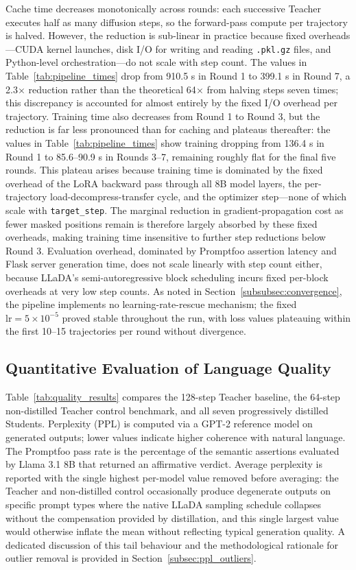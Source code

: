 \documentclass[11pt, a4paper]{article}
\begin{document}
Cache time decreases monotonically across rounds: each successive Teacher executes half as many diffusion steps, so the forward-pass compute per trajectory is halved. However, the reduction is sub-linear in practice because fixed overheads---CUDA kernel launches, disk I/O for writing and reading \texttt{.pkl.gz} files, and Python-level orchestration---do not scale with step count. The values in Table~\ref{tab:pipeline_times} drop from 910.5 s in Round 1 to 399.1 s in Round 7, a 2.3$\times$ reduction rather than the theoretical 64$\times$ from halving steps seven times; this discrepancy is accounted for almost entirely by the fixed I/O overhead per trajectory. Training time also decreases from Round 1 to Round 3, but the reduction is far less pronounced than for caching and plateaus thereafter: the values in Table~\ref{tab:pipeline_times} show training dropping from 136.4 s in Round 1 to 85.6--90.9 s in Rounds 3--7, remaining roughly flat for the final five rounds. This plateau arises because training time is dominated by the fixed overhead of the LoRA backward pass through all 8B model layers, the per-trajectory load-decompress-transfer cycle, and the optimizer step---none of which scale with \texttt{target\_step}. The marginal reduction in gradient-propagation cost as fewer masked positions remain is therefore largely absorbed by these fixed overheads, making training time insensitive to further step reductions below Round 3. Evaluation overhead, dominated by Promptfoo assertion latency and Flask server generation time, does not scale linearly with step count either, because LLaDA's semi-autoregressive block scheduling incurs fixed per-block overheads at very low step counts. As noted in Section~\ref{subsubsec:convergence}, the pipeline implements no learning-rate-rescue mechanism; the fixed $\text{lr} = 5 \times 10^{-5}$ proved stable throughout the run, with loss values plateauing within the first 10--15 trajectories per round without divergence.

\subsection{Quantitative Evaluation of Language Quality}
\label{subsec:quality_results}

Table~\ref{tab:quality_results} compares the 128-step Teacher baseline, the 64-step non-distilled Teacher control benchmark, and all seven progressively distilled Students. Perplexity (PPL) is computed via a GPT-2 reference model on generated outputs; lower values indicate higher coherence with natural language. The Promptfoo pass rate is the percentage of the semantic assertions evaluated by Llama 3.1 8B that returned an affirmative verdict. Average perplexity is reported with the single highest per-model value removed before averaging: the Teacher and non-distilled control occasionally produce degenerate outputs on specific prompt types where the native LLaDA sampling schedule collapses without the compensation provided by distillation, and this single largest value would otherwise inflate the mean without reflecting typical generation quality. A dedicated discussion of this tail behaviour and the methodological rationale for outlier removal is provided in Section~\ref{subsec:ppl_outliers}.
\end{document}
